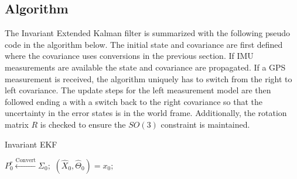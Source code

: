 \subsection{Algorithm}
The Invariant Extended Kalman filter is summarized with the following pseudo code in the algorithm below. The initial state and covariance are first defined where the covariance uses conversions in the previous section. If IMU measurements are available the state and covariance are propagated. If a GPS measurement is received, the algorithm uniquely has to switch from the right to left covariance. The update steps for the left measurement model are then followed ending a with a switch back to the right covariance so that the uncertainty in the error states is in the world frame. Additionally, the rotation matrix $R$ is checked to ensure the $SO(3)$ constraint is maintained.

\begin{algorithm}[H]
\caption{Invariant EKF}\label{alg: InEKF}
$P^r_0 \xleftarrow{\text{Convert}} \Sigma_{0};$ 
$(\hat{X}_0, \hat{\Theta}_0 ) = x_0;$ 

\end{algorithm}
